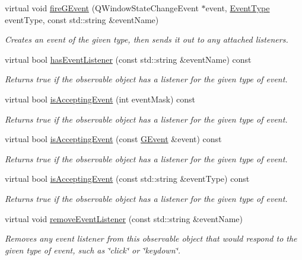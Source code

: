 \begin{DoxyCompactItemize}
virtual void \mbox{\hyperlink{classsgl_1_1GObservable_a2a70a7d7435ff0c3b80bb4d70da19e0d}{fire\+G\+Event}} (Q\+Window\+State\+Change\+Event $\ast$event, \mbox{\hyperlink{namespacesgl_a2628ea8d12e8b2563c32f05dc7fff6fa}{Event\+Type}} event\+Type, const std\+::string \&event\+Name)
\begin{DoxyCompactList}\small\item\em Creates an event of the given type, then sends it out to any attached listeners. \end{DoxyCompactList}\item 
virtual bool \mbox{\hyperlink{classsgl_1_1GObservable_a9f6faaa25942923bafa1c44020c49fa9}{has\+Event\+Listener}} (const std\+::string \&event\+Name) const
\begin{DoxyCompactList}\small\item\em Returns true if the observable object has a listener for the given type of event. \end{DoxyCompactList}\item 
virtual bool \mbox{\hyperlink{classsgl_1_1GObservable_aeec1adc19aa0f33de62390686ee1382c}{is\+Accepting\+Event}} (int event\+Mask) const
\begin{DoxyCompactList}\small\item\em Returns true if the observable object has a listener for the given type of event. \end{DoxyCompactList}\item 
virtual bool \mbox{\hyperlink{classsgl_1_1GObservable_aa31c73145a29dcb92848a92e0cfaea41}{is\+Accepting\+Event}} (const \mbox{\hyperlink{classsgl_1_1GEvent}{G\+Event}} \&event) const
\begin{DoxyCompactList}\small\item\em Returns true if the observable object has a listener for the given type of event. \end{DoxyCompactList}\item 
virtual bool \mbox{\hyperlink{classsgl_1_1GObservable_a3b1c689267eda44e65a2213e7de38b23}{is\+Accepting\+Event}} (const std\+::string \&event\+Type) const
\begin{DoxyCompactList}\small\item\em Returns true if the observable object has a listener for the given type of event. \end{DoxyCompactList}\item 
virtual void \mbox{\hyperlink{classsgl_1_1GObservable_acbcf1ed3a851ad8a3c17ef38d86b481d}{remove\+Event\+Listener}} (const std\+::string \&event\+Name)
\begin{DoxyCompactList}\small\item\em Removes any event listener from this observable object that would respond to the given type of event, such as \char`\"{}click\char`\"{} or \char`\"{}keydown\char`\"{}. \end{DoxyCompactList}\item 

\end{DoxyCompactItemize}
